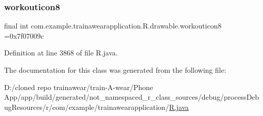 \mbox{\label{classcom_1_1example_1_1trainawearapplication_1_1_r_1_1drawable_af5392e26a2460e42f5b2b8bf22cba82d}} 
\subsubsection{\texorpdfstring{workouticon8}{workouticon8}}
{\footnotesize\ttfamily final int com.\+example.\+trainawearapplication.\+R.\+drawable.\+workouticon8 =0x7f07009c\hspace{0.3cm}{\ttfamily [static]}}



Definition at line 3868 of file R.\+java.



The documentation for this class was generated from the following file\+:\begin{DoxyCompactItemize}
\item 
D\+:/cloned repo trainawear/train-\/\+A-\/wear/\+Phone App/app/build/generated/not\+\_\+namespaced\+\_\+r\+\_\+class\+\_\+sources/debug/process\+Debug\+Resources/r/com/example/trainawearapplication/\mbox{\hyperlink{process_debug_resources_2r_2com_2example_2trainawearapplication_2_r_8java}{R.\+java}}\end{DoxyCompactItemize}
